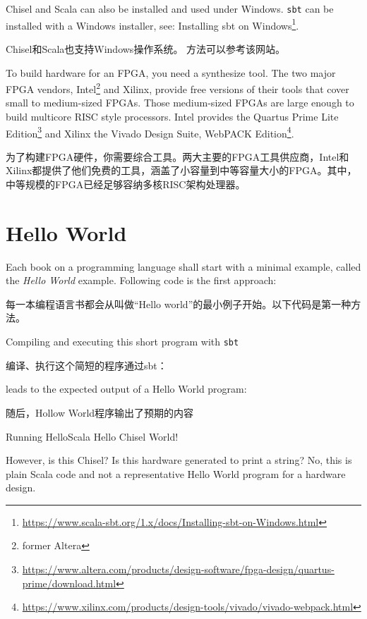 \documentclass[%
    10pt,
    headinclude, footexclude,
    openright, %
    notitlepage,
    cleardoubleempty,
    headsepline,
    pointlessnumbers,
    bibtotoc, idxtotoc,
    ]{scrbook}
\newcommand{\code}[1]{{\small{\texttt{#1}}}}
\newcommand{\myref}[2]{\href{#1}{#2}}
\renewcommand{\myref}[2]{{#2}{\footnote{\url{#1}}}}
\begin{document}
Chisel and Scala can also be installed and used under Windows.
\code{sbt} can be installed with a Windows installer, see:
\myref{https://www.scala-sbt.org/1.x/docs/Installing-sbt-on-Windows.html}{Installing sbt on Windows}.

Chisel和Scala也支持Windows操作系统。
方法可以参考该网站。

To build hardware for an FPGA, you need a synthesize tool. The two major
FPGA vendors, Intel\footnote{former Altera} and Xilinx, provide free versions of
their tools that cover small to medium-sized FPGAs. Those medium-sized
FPGAs are large enough to build multicore RISC style processors.
Intel provides the \myref{https://www.altera.com/products/design-software/fpga-design/quartus-prime/download.html}{Quartus Prime Lite Edition} and Xilinx the
\myref{https://www.xilinx.com/products/design-tools/vivado/vivado-webpack.html}{Vivado Design Suite, WebPACK Edition}.

为了构建FPGA硬件，你需要综合工具。两大主要的FPGA工具供应商，Intel和Xilinx都提供了他们免费的工具，涵盖了小容量到中等容量大小的FPGA。其中，中等规模的FPGA已经足够容纳多核RISC架构处理器。


\section{Hello World}

Each book on a programming language shall start with a minimal example,
called the \emph{Hello World} example. Following code is the first approach:

每一本编程语言书都会从叫做“Hello world”的最小例子开始。以下代码是第一种方法。




\noindent Compiling and executing this short program with \code{sbt}

编译、执行这个简短的程序通过sbt：


\noindent leads to the expected output of a Hello World program:

随后，Hollow World程序输出了预期的内容

\begin{chisel}
[info] Running HelloScala
Hello Chisel World!
\end{chisel}

\noindent However, is this Chisel? Is this hardware generated to print a string?
No, this is plain Scala code and not a representative Hello World
program for a hardware design.
\end{document}
